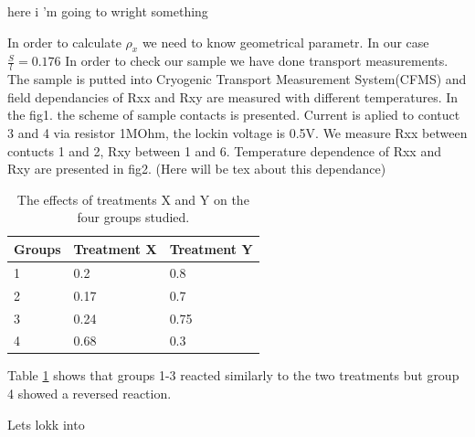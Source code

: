 \documentclass[idxtotoc,hyperref,openany,oneside]{labbook} %
\begin{document}

here i 'm going to wright something


In order to calculate $\rho_x$ we need to know geometrical parametr. In our case $\frac{S}{l}=0.176$
In order to check our sample we have done transport measurements. The sample is putted into Cryogenic Transport Measurement System(CFMS) and field dependancies of Rxx and Rxy are measured with different temperatures. 
In the fig1. the scheme of sample contacts is presented. Current is aplied to contuct  3 and 4 via resistor 1MOhm, the lockin voltage is 0.5V. We measure Rxx between contucts  1 and 2, Rxy  between  1 and 6. 
Temperature dependence of Rxx and Rxy are presented in fig2.
(Here will be tex about this dependance)
 

\begin{table}[H]
\begin{tabular}{l l l}
\toprule
\textbf{Groups} & \textbf{Treatment X} & \textbf{Treatment Y} \\
\toprule
1 & 0.2 & 0.8\\
2 & 0.17 & 0.7\\
3 & 0.24 & 0.75\\
4 & 0.68 & 0.3\\
\bottomrule
\end{tabular}
\caption{The effects of treatments X and Y on the four groups studied.}
\label{tab:treatments_xy}
\end{table}

Table \ref{tab:treatments_xy} shows that groups 1-3 reacted similarly to the two treatments but group 4 showed a reversed reaction.

Lets lokk into
\end{document}

